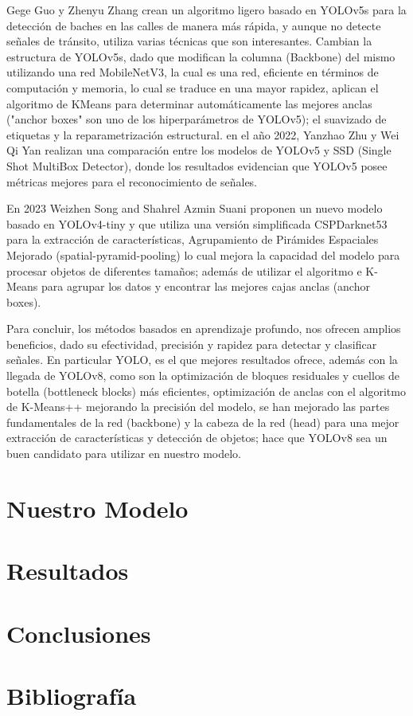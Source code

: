 \documentclass{article}
\begin{document}
Gege Guo y Zhenyu Zhang \cite{ref9} crean un algoritmo ligero basado en YOLOv5s para la detección de baches en las calles de manera más rápida, y aunque no detecte señales de tránsito, utiliza varias técnicas que son interesantes. Cambian la estructura de YOLOv5s, dado que modifican la columna (Backbone) del mismo utilizando una red MobileNetV3, la cual es una red, eficiente en términos de computación y memoria, lo cual se traduce en una mayor rapidez, aplican el algoritmo de KMeans para determinar automáticamente las mejores anclas ("anchor boxes" son uno de los hiperparámetros de YOLOv5); el suavizado de etiquetas y la reparametrización estructural. en el año 2022, Yanzhao Zhu y Wei Qi Yan \cite{ref1} realizan una comparación entre los modelos de YOLOv5 y SSD (Single Shot MultiBox Detector), donde los resultados evidencian que YOLOv5 posee métricas mejores para el reconocimiento de señales.


En 2023 Weizhen Song and Shahrel Azmin Suani\cite{ref2} proponen un nuevo modelo basado en YOLOv4-tiny y que utiliza una versión simplificada CSPDarknet53 para la extracción de características, Agrupamiento de Pirámides Espaciales Mejorado (spatial-pyramid-pooling) lo cual mejora la capacidad del modelo para procesar objetos de diferentes tamaños; además de utilizar el algoritmo e K-Means para agrupar los datos y encontrar las mejores cajas anclas (anchor boxes).

Para concluir, los métodos basados en aprendizaje profundo, nos ofrecen amplios beneficios, dado su efectividad, precisión y rapidez para detectar y clasificar señales. En particular YOLO, es el que mejores resultados ofrece, además con la llegada de YOLOv8, como son la optimización de bloques residuales y cuellos de botella (bottleneck blocks) más eficientes, optimización de anclas con el algoritmo de K-Means++ mejorando la precisión del modelo, se han mejorado las partes fundamentales de la red (backbone) y la cabeza de la red (head) para una mejor extracción de características y detección de objetos; hace que YOLOv8 sea un buen candidato para utilizar en nuestro modelo.
\section{Nuestro Modelo}
\lipsum[1-4]
\section{Resultados}
\lipsum[1-4]
\section{Conclusiones}
\lipsum[1-4]
\section{Bibliografía}

 
\end{document}
